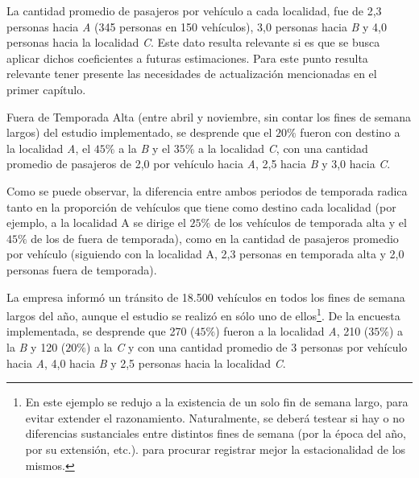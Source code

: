\documentclass[
]{book}
\begin{document}
La cantidad promedio de pasajeros por vehículo a cada localidad, fue de 2,3 personas hacia \emph{A} (345 personas en 150 vehículos), 3,0 personas hacia \emph{B} y 4,0 personas hacia la localidad \emph{C}. Este dato resulta relevante si es que se busca aplicar dichos coeficientes a futuras estimaciones. Para este punto resulta relevante tener presente las necesidades de actualización mencionadas en el primer capítulo.

Fuera de Temporada Alta (entre abril y noviembre, sin contar los fines de semana largos) del estudio implementado, se desprende que el \(20\%\) fueron con destino a la localidad \emph{A}, el \(45\%\) a la \emph{B} y el \(35\%\) a la localidad \emph{C}, con una cantidad promedio de pasajeros de 2,0 por vehículo hacia \emph{A}, 2,5 hacia \emph{B} y 3,0 hacia \emph{C}.

Como se puede observar, la diferencia entre ambos periodos de temporada radica tanto en la proporción de vehículos que tiene como destino cada localidad (por ejemplo, a la localidad A se dirige el \(25\%\) de los vehículos de temporada alta y el \(45\%\) de los de fuera de temporada), como en la cantidad de pasajeros promedio por vehículo (siguiendo con la localidad A, 2,3 personas en temporada alta y 2,0 personas fuera de temporada).

La empresa informó un tránsito de 18.500 vehículos en todos los fines de semana largos del año, aunque el estudio se realizó en sólo uno de ellos\footnote{En este ejemplo se redujo a la existencia de un solo fin de semana largo, para evitar extender el razonamiento. Naturalmente, se deberá testear si hay o no diferencias sustanciales entre distintos fines de semana (por la época del año, por su extensión, etc.). para procurar registrar mejor la estacionalidad de los mismos.}. De la encuesta implementada, se desprende que 270 (\(45\%\)) fueron a la localidad \emph{A}, 210 (\(35\%\)) a la \emph{B} y 120 (\(20\%\)) a la \emph{C} y con una cantidad promedio de 3 personas por vehículo hacia \emph{A}, 4,0 hacia \emph{B} y 2,5 personas hacia la localidad \emph{C}.
\end{document}
